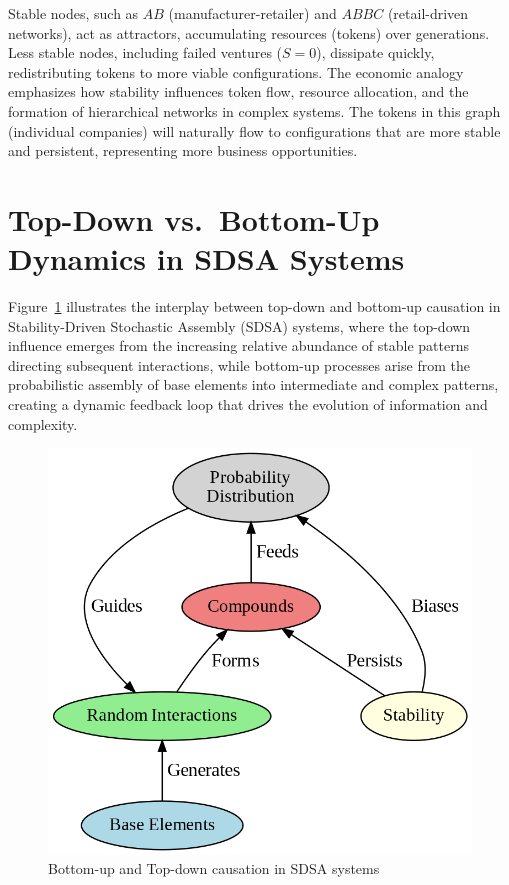 \documentclass[preprint,12pt]{elsarticle}
\begin{document}
Stable nodes, such as \( AB \) (manufacturer-retailer) and \( ABBC \) (retail-driven networks), act as attractors, accumulating resources (tokens) over generations. Less stable nodes, including failed ventures (\( S=0 \)), dissipate quickly, redistributing tokens to more viable configurations. The economic analogy emphasizes how stability influences token flow, resource allocation, and the formation of hierarchical networks in complex systems. The tokens in this graph (individual companies) will naturally flow to configurations that are more stable and persistent, representing more business opportunities.

\section{Top-Down vs.\ Bottom-Up Dynamics in SDSA Systems}
\label{sec:topdown-bottomup}

Figure~\ref{fig:figure_10} illustrates the interplay between top-down and bottom-up causation in Stability-Driven Stochastic Assembly (SDSA) systems, where the top-down influence emerges from the increasing relative abundance of stable patterns directing subsequent interactions, while bottom-up processes arise from the probabilistic assembly of base elements into intermediate and complex patterns, creating a dynamic feedback loop that drives the evolution of information and complexity.

\begin{figure}[h]
    \centering
    \includegraphics[width=0.7\linewidth,height=0.7\linewidth]{figure_10.png}
    \caption{Bottom-up and Top-down causation in SDSA systems}
    \label{fig:figure_10}
\end{figure}
\end{document}
